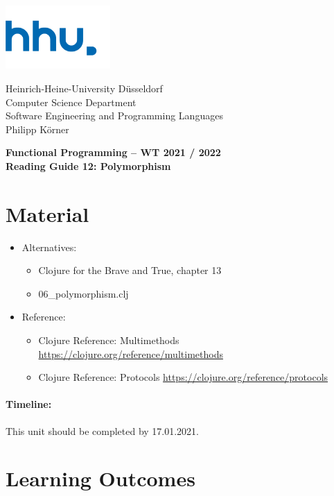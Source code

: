 \documentclass[11pt,a4paper]{article}
\begin{document}
\begin{minipage}[b]{\textwidth}
	\parbox[t]{5cm}{%
		\includegraphics[width=4cm]{unilogo}
		\hfill
	}
	\parbox[b]{11cm}{%
		Heinrich-Heine-University D\"usseldorf\\
		Computer Science Department\\
		Software Engineering and Programming Languages\\
		Philipp K\"orner
	}
\end{minipage}
\begin{center}
	\bf
	Functional Programming -- WT 2021 / 2022\\
	Reading Guide 12: Polymorphism
\end{center}

\pagestyle{empty}

\section{Material} 

\begin{itemize}
    \item Alternatives:
        \begin{itemize}
\item Clojure for the Brave and True, chapter 13
\item 06\_polymorphism.clj
        \end{itemize}
    \item Reference:
        \begin{itemize}
\item Clojure Reference: Multimethods \url{https://clojure.org/reference/multimethods}
\item Clojure Reference: Protocols \url{https://clojure.org/reference/protocols}
        \end{itemize}
\end{itemize}

\paragraph{Timeline:} This unit should be completed by 17.01.2021.


\section{Learning Outcomes}
\end{document}
